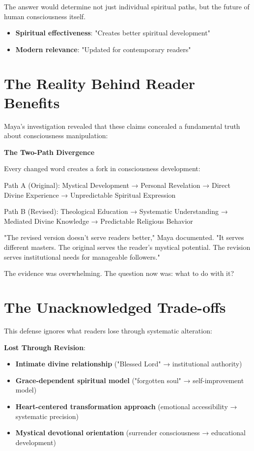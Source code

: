\documentclass[11pt,twoside]{book}
\begin{document}
The answer would determine not just individual spiritual paths, but the future of human consciousness itself.
\begin{itemize}
\item \textbf{\textbf{Spiritual effectiveness}}: "Creates better spiritual development"
\item \textbf{\textbf{Modern relevance}}: "Updated for contemporary readers"
\end{itemize}
\section*{The Reality Behind Reader Benefits}
\label{sec:org22ad2b8}

Maya's investigation revealed that these claims concealed a fundamental truth about consciousness manipulation:

\textbf{\textbf{The Two-Path Divergence}}

Every changed word creates a fork in consciousness development:

Path A (Original): 
Mystical Development → Personal Revelation → Direct Divine Experience → Unpredictable Spiritual Expression

Path B (Revised):
Theological Education → Systematic Understanding → Mediated Divine Knowledge → Predictable Religious Behavior

"The revised version doesn't serve readers better," Maya documented. "It serves different masters. The original serves the reader's mystical potential. The revision serves institutional needs for manageable followers."

The evidence was overwhelming. The question now was: what to do with it?
\section*{The Unacknowledged Trade-offs}
\label{sec:org5113381}
This defense ignores what readers lose through systematic alteration:

\textbf{\textbf{Lost Through Revision}}:
\begin{itemize}
\item \textbf{\textbf{Intimate divine relationship}} ("Blessed Lord" → institutional authority)
\item \textbf{\textbf{Grace-dependent spiritual model}} ("forgotten soul" → self-improvement model)
\item \textbf{\textbf{Heart-centered transformation approach}} (emotional accessibility → systematic precision)
\item \textbf{\textbf{Mystical devotional orientation}} (surrender consciousness → educational development)
\end{itemize}
\end{document}
